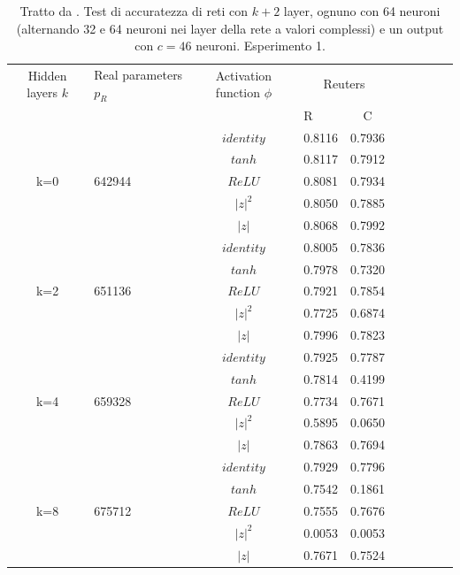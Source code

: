 \documentclass[a4paper,12pt]{report}
\begin{document}
 \begin{table}
  \centering
  \begin{tabular}{cp{} cp{}   cp{} cp{} cp{}}
   \cline{1-5}
   Hidden layers $k$ & Real parameters $p_R$ & Activation function $\phi$ & \multicolumn{2}{c}{Reuters}\\
   \cline{4-5}
   & & & R & C \\
   \cline{1-5}
   & & $identity$ & 0.8116 & 0.7936 \\
   \cline{3-5}
   & & $tanh$ & 0.8117 & 0.7912 \\
   \cline{3-5}
   k=0 & 642944 & $ReLU$ & 0.8081 & 0.7934 \\
   \cline{3-5}
   & & $|z|^2$ & 0.8050 & 0.7885 \\
   \cline{3-5}
   & & $|z|$ & 0.8068 & 0.7992 \\
   \cline{1-5}
  
   & & $identity$ & 0.8005 & 0.7836 \\
   \cline{3-5}
   & & $tanh$ & 0.7978 & 0.7320 \\
   \cline{3-5}
   k=2 & 651136 & $ReLU$ & 0.7921 & 0.7854 \\
   \cline{3-5}
   & & $|z|^2$ & 0.7725 & 0.6874 \\
   \cline{3-5}
   & & $|z|$ & 0.7996 & 0.7823 \\
   \cline{1-5}
  
   & & $identity$ & 0.7925 & 0.7787 \\
   \cline{3-5}
   & & $tanh$ & 0.7814 & 0.4199 \\
   \cline{3-5}
   k=4 & 659328 & $ReLU$ & 0.7734 & 0.7671 \\
   \cline{3-5}
   & & $|z|^2$ & 0.5895 & 0.0650 \\
   \cline{3-5}
   & & $|z|$ & 0.7863 & 0.7694 \\
   \cline{1-5}
   
   & & $identity$ & 0.7929 & 0.7796 \\
   \cline{3-5}
   & & $tanh$ & 0.7542 & 0.1861 \\
   \cline{3-5}
   k=8 & 675712 & $ReLU$ & 0.7555 & 0.7676 \\
   \cline{3-5}
   & & $|z|^2$ & 0.0053 & 0.0053 \\
   \cline{3-5}
   & & $|z|$ & 0.7671 & 0.7524 \\
   \cline{1-5}
  \end{tabular}
  \caption{Tratto da \cite{monning2018evaluation}. Test di accuratezza di reti con $k+2$ layer, ognuno con 64 neuroni (alternando 32 e 64 neuroni nei layer della rete a valori complessi) e un output con $c=46$ neuroni. Esperimento 1.}
  \label{Reuters1Tab}
 \end{table}
 
\end{document}
